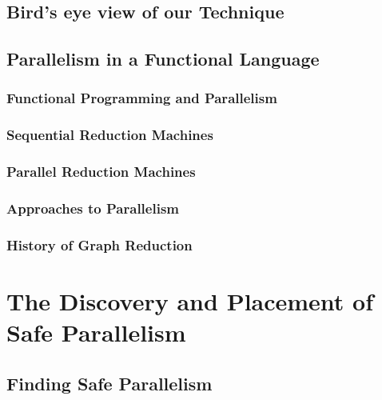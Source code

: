 \documentclass[dottedtoc, headinclude, footinclude=true, a4paper]{scrreprt}
\begin{document}
\chapter{Bird's eye view of our Technique}

\chapter{Parallelism in a Functional Language}

    

    \section{Functional Programming and Parallelism}
    \label{sec:FPandPar}
    

    \section{Sequential Reduction Machines}
    \label{sec:SequentialMachines}
    

    \section{Parallel Reduction Machines}
    \label{sec:ParallelMachines}
    

    \section{Approaches to Parallelism}
    \label{sec:Approaches}
    
    
    \section{History of Graph Reduction}
    

\part{The Discovery and Placement of Safe Parallelism}

\chapter{Finding Safe Parallelism}
\label{chap:discovery}
\end{document}
